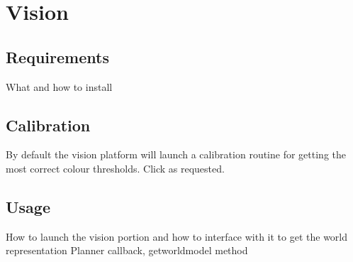 \section{Vision}
\subsection{Requirements}
What and how to install

\subsection{Calibration}
By default the vision platform will launch a calibration routine for getting the most correct colour thresholds. Click as requested.

\subsection{Usage}
How to launch the vision portion and how to interface with it to get the world representation
Planner callback, getworldmodel method